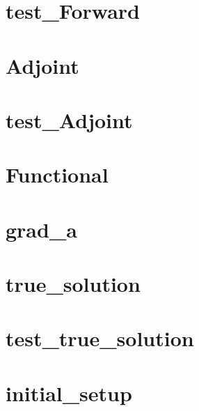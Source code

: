 \documentclass[letterpaper, 10pt]{amsart}
\theoremstyle{definition}
\theoremstyle{remark}
\begin{document}
\section{test\_Forward}\label{sec:code-listing-test-forward}
{\small

}

\section{Adjoint}\label{sec:code-listing-adjoint}
{\small

}

\section{test\_Adjoint}\label{sec:code-listing-test-adjoint}
{\small

}

\section{Functional}\label{sec:code-listing-functional}
{\small

}

\section{grad\_a}\label{sec:code-listing-grad-s}
{\small

}

\section{true\_solution}\label{sec:code-listing-true-solution}
{\small

}

\section{test\_true\_solution}\label{sec:code-listing-test-true-solution}
{\small

}

\section{initial\_setup}\label{sec:code-listing-initial-setup}
{\small

}



\end{document}
